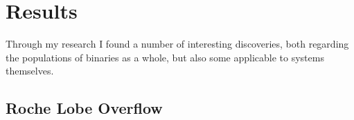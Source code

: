 \documentclass[12pt, a4paper]{article}
\begin{document}
    \section{\centering Results}
        Through my research I found a number of interesting discoveries, both regarding the populations of binaries as a whole, but also some applicable to systems themselves.
  
        \subsection{\centering Roche Lobe Overflow}
            



\end{document}
